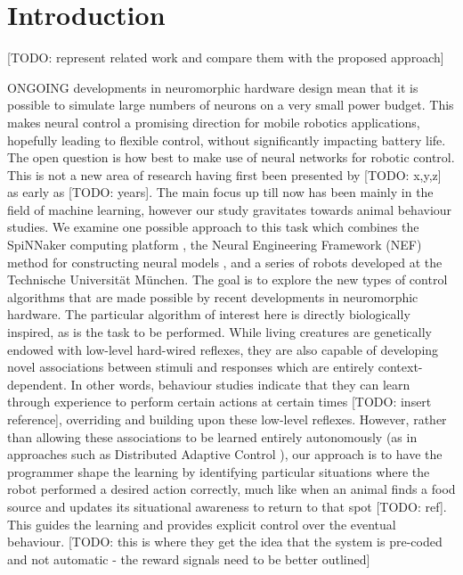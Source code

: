 \documentclass[conference]{IEEEtran}
\begin{document}
\IEEEpeerreviewmaketitle


\section{Introduction}

[TODO: represent related work and compare them with the proposed approach]

ONGOING developments in neuromorphic hardware design mean that it is possible to simulate large numbers of neurons on a very small power budget. This makes neural control a promising direction for mobile robotics applications, hopefully leading to flexible control, without significantly impacting battery life. The open question is how best to make use of neural networks for robotic control. This is not a new area of research having first been presented by [TODO: x,y,z] as early as [TODO: years]. The main focus up till now has been mainly in the field of machine learning, however our study gravitates towards animal behaviour studies. We examine one possible approach to this task which combines the SpiNNaker computing platform \cite{furber2007neural, furber2014spinnaker}, the Neural Engineering Framework (NEF) method for constructing neural models \cite{eliasmith2004neural}, and a series of robots developed at the Technische Universit{\"a}t M{\"u}nchen. The goal is to explore the new types of control algorithms that are made possible by recent developments in neuromorphic hardware. The particular algorithm of interest here is directly biologically inspired, as is the task to be performed. While living creatures are genetically endowed with low-level hard-wired reflexes, they are also capable of developing novel associations between stimuli and responses which are entirely context-dependent. In other words, behaviour studies indicate that they can learn through experience to perform certain actions at certain times [TODO: insert reference], overriding and building upon these low-level reflexes. However, rather than allowing these associations to be learned entirely autonomously (as in approaches such as Distributed Adaptive Control \cite{verschure2012distributed}), our approach is to have the programmer shape the learning by identifying particular situations where the robot performed a desired action correctly, much like when an animal finds a food source and updates its situational awareness to return to that spot [TODO: ref]. This guides the learning and provides explicit control over the eventual behaviour. [TODO: this is where they get the idea that the system is pre-coded and not automatic - the reward signals need to be better outlined]
\end{document}
